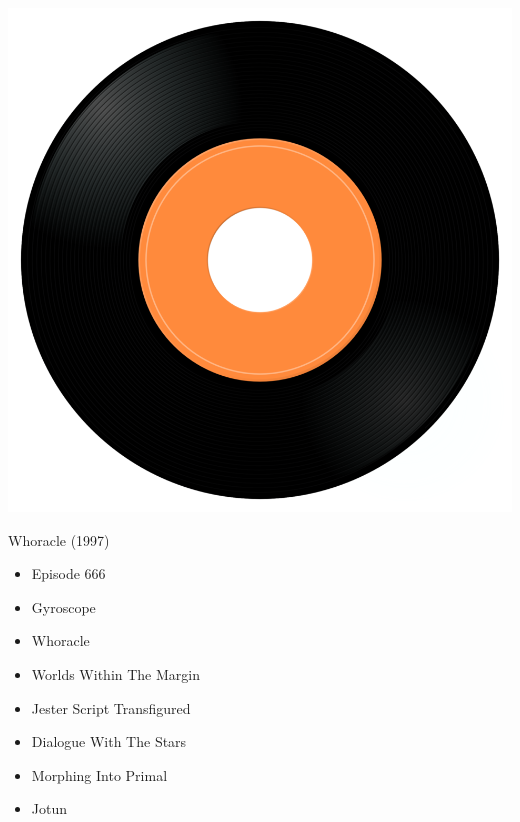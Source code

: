 \begin{minipage}[t]{0.25\textwidth}\vspace{0pt}
\captionsetup{type=figure}
\includegraphics[width=\textwidth]{Images/cover.png}
\caption*{Whoracle (1997)}
\end{minipage}
\begin{minipage}[t]{0.25\textwidth}\vspace{0pt}
\begin{itemize}[nosep,leftmargin=1em,labelwidth=*,align=left]
	\setlength{\itemsep}{0pt}
	\item Episode 666
	\item Gyroscope
	\item Whoracle
	\item Worlds Within The Margin
	\item Jester Script Transfigured
	\item Dialogue With The Stars
	\item Morphing Into Primal
	\item Jotun
\end{itemize}
\end{minipage}
